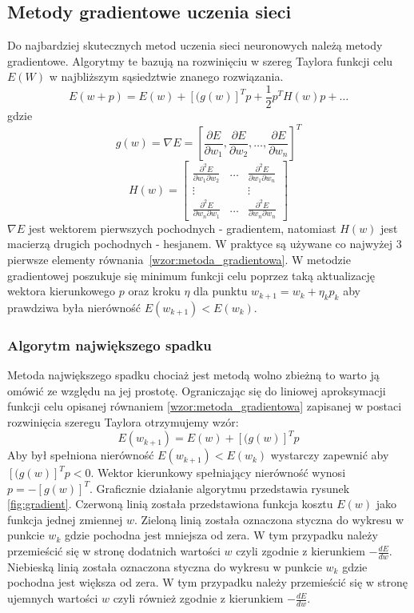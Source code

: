 \subsection{Metody gradientowe uczenia sieci}
Do najbardziej skutecznych metod uczenia sieci neuronowych należą metody gradientowe. Algorytmy te bazują na rozwinięciu w szereg Taylora funkcji celu $E(W)$ w najbliższym sąsiedztwie znanego rozwiązania\cite{Osowski}.
\begin{equation}
	\label{wzor:metoda_gradientowa}
	E(w + p) = E(w) + [(g(w)]^Tp + \frac{1}{2}p^TH(w)p + \hdots
\end{equation}
gdzie
$$g(w) = \nabla E = [\frac{\partial E}{\partial w_1}, \frac{\partial E}{\partial w_2}, \hdots, \frac{\partial E}{\partial w_n}]^T$$
$$H(w) = \begin{bmatrix}
\frac{\partial^2 E}{\partial w_1 \partial w_2} & \hdots & \frac{\partial^2 E}{\partial w_1 \partial w_n}\\
\vdots & & \vdots \\
\frac{\partial^2 E}{\partial w_n \partial w_1} & \hdots & \frac{\partial^2 E}{\partial w_n \partial w_n}
\end{bmatrix}$$
$\nabla E$ jest wektorem pierwszych pochodnych - gradientem, natomiast $H(w)$ jest macierzą drugich pochodnych - hesjanem. W praktyce są używane co najwyżej 3 pierwsze elementy równania~\ref{wzor:metoda_gradientowa}. W metodzie gradientowej poszukuje się minimum funkcji celu poprzez taką aktualizację wektora kierunkowego $p$ oraz kroku $\eta$ dla punktu $w_{k+1} = w_k + \eta_k p_k$ aby prawdziwa była nierówność $E(w_{k+1}) < E(w_k)$.

\subsubsection*{Algorytm największego spadku}
Metoda największego spadku chociaż jest metodą wolno zbieżną to warto ją omówić ze względu na jej prostotę. Ograniczając się do liniowej aproksymacji funkcji celu opisanej równaniem \ref{wzor:metoda_gradientowa} zapisanej w postaci rozwinięcia szeregu Taylora otrzymujemy wzór:
\begin{equation}
	E(w_{k+1}) = E(w) + [(g(w)]^Tp
\end{equation} 
Aby był spełniona nierówność $E(w_{k+1}) < E(w_k)$ wystarczy zapewnić aby $[(g(w)]^Tp < 0$. Wektor kierunkowy spełniający nierówność wynosi $p = -[g(w)]^T$. Graficznie działanie algorytmu przedstawia rysunek \ref{fig:gradient}. Czerwoną linią została przedstawiona funkcja kosztu $E(w)$ jako funkcja jednej zmiennej $w$. Zieloną linią została oznaczona styczna do wykresu w punkcie $w_k$ gdzie pochodna jest mniejsza od zera. W tym przypadku należy przemieścić się w stronę dodatnich wartości $w$ czyli zgodnie z kierunkiem $-\frac{dE}{dw}$. Niebieską linią została oznaczona styczna do wykresu w punkcie $w_k$ gdzie pochodna jest większa od zera. W tym przypadku należy przemieścić się w stronę ujemnych wartości $w$ czyli również zgodnie z kierunkiem $-\frac{dE}{dw}$.

